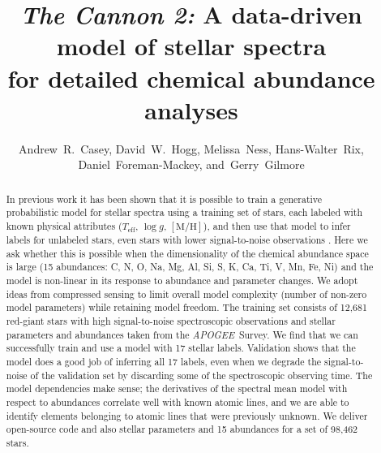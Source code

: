 \documentclass[12pt,preprint]{aastex}
\newcommand{\project}[1]{\textsl{#1}}
\newcommand{\acronym}[1]{{\small{#1}}}
\newcommand{\apogee}{\project{\acronym{APOGEE}}}
\newcommand{\logg}{\log g}
\newcommand{\mh}{\mathrm{[M/H]}}
\newcommand{\Teff}{T_{\mathrm{eff}}}
\begin{document}
\title{\textsl{The Cannon 2:} A data-driven model of stellar spectra \\
       for detailed chemical abundance analyses}
\author{Andrew~R.~Casey,
        David~W.~Hogg,
        Melissa~Ness,
        Hans-Walter~Rix,
        Daniel~Foreman-Mackey,
    and~Gerry~Gilmore}


\begin{abstract}
In previous work it has been shown that it is possible to train a generative
probabilistic model for stellar spectra using a training set of stars, each 
labeled with known physical attributes ($\Teff$, $\logg$, $\mh$), and then use 
that model to infer labels for unlabeled stars, even stars with lower 
signal-to-noise observations \citet{tc}.
Here we ask whether this is possible when the dimensionality of the chemical
abundance space is large (15 abundances: C, N, O, Na, Mg, Al, Si, S, K, Ca, Ti, 
V, Mn, Fe, Ni) and the model is non-linear in its response to abundance and 
parameter changes.
We adopt ideas from compressed sensing to limit overall model complexity (number
of non-zero model parameters) while retaining model freedom.  The training set 
consists of 12,681 red-giant stars with high signal-to-noise spectroscopic 
observations and stellar parameters and abundances taken from the \apogee\ 
Survey.
We find that we can successfully train and use a model with 17 stellar labels.
Validation shows that the model does a good job of inferring all 17 labels, even
when we degrade the signal-to-noise of the validation set by discarding some of
the spectroscopic observing time.  The model dependencies make sense; the 
derivatives of the spectral mean model with respect to abundances correlate well
with known atomic lines, and we are able to identify elements belonging to 
atomic lines that were previously unknown.  We deliver open-source code and also
stellar parameters and 15 abundances for a set of 98,462 stars.
\end{abstract}
\end{document}
